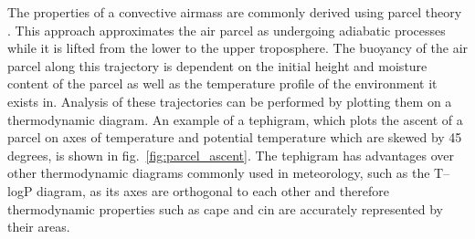 The properties of a convective airmass are commonly derived using parcel theory \citep{stull_practical_2016}. 
This approach approximates the air parcel as undergoing adiabatic processes while it is lifted from the lower to the upper troposphere. 
The buoyancy of the air parcel along this trajectory is dependent on the initial height and moisture content of the parcel as well as the temperature profile of the environment it exists in. 
Analysis of these trajectories can be performed by plotting them on a thermodynamic diagram. 
An example of a tephigram, which plots the ascent of a parcel on axes of temperature and potential temperature which are skewed by 45 degrees, is shown in fig.~\ref{fig:parcel_ascent}.
The tephigram has advantages over other thermodynamic diagrams commonly used in meteorology, such as the T--logP diagram, as its axes are orthogonal to each other and therefore thermodynamic properties such as \acrshort{cape} and \acrshort{cin} are accurately represented by their areas.

